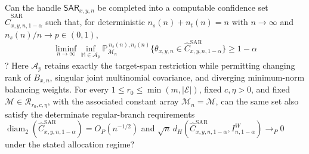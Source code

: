 Can the handle \(\mathsf{SAR}_{x,y,n}\) be completed into a computable confidence set \(\widehat C^{\mathrm{SAR}}_{x,y,n,1-\alpha}\) such that, for deterministic \(n_s(n)+n_t(n)=n\) with \(n\to\infty\) and \(n_s(n)/n\to p\in(0,1)\), \[\liminf_{n\to\infty}\inf_{\mathbb M\in\mathcal A_p}\mathbb P_{\mathcal M_n}^{\,n_s(n),n_t(n)}\{\theta_{x,y,n}\in\widehat C^{\mathrm{SAR}}_{x,y,n,1-\alpha}\}\ge1-\alpha\]? Here \(\mathcal A_p\) retains exactly the target-span restriction while permitting changing rank of \(B_{x,n}\), singular joint multinomial covariance, and diverging minimum-norm balancing weights. For every \(1\le r_0\le\min(m,\lvert\mathcal E\rvert)\), fixed \(c,\eta>0\), and fixed \(\mathcal M\in\mathcal R_{r_0,c,\eta}\), with the associated constant array \(\mathcal M_n=\mathcal M\), can the same set also satisfy the determinate regular-branch requirements \(\operatorname{diam}_2(\widehat C^{\mathrm{SAR}}_{x,y,n,1-\alpha})=O_P(n^{-1/2})\) and \(\sqrt n\,d_H(\widehat C^{\mathrm{SAR}}_{x,y,n,1-\alpha},I^W_{n,1-\alpha})\to_P0\) under the stated allocation regime?
